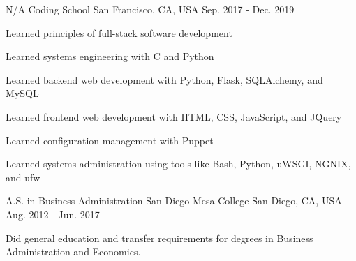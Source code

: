 

\begin{cventries}

  \cventry
    {N/A} %
    {Coding School} %
    {San Francisco, CA, USA} %
    {Sep. 2017 - Dec. 2019} %
    {
      \begin{cvitems} %
        \item {Learned principles of full-stack software development}
        \item {Learned systems engineering with C and Python}
        \item {Learned backend web development with Python, Flask, SQLAlchemy, and MySQL}
        \item {Learned frontend web development with HTML, CSS, JavaScript, and JQuery}
        \item {Learned configuration management with Puppet}
        \item {Learned systems administration using tools like Bash, Python, uWSGI, NGNIX, and ufw}
      \end{cvitems}
    }

  \cventry
    {A.S. in Business Administration} %
    {San Diego Mesa College} %
    {San Diego, CA, USA} %
    {Aug. 2012 - Jun. 2017} %
    {
      \begin{cvitems} %
        \item {Did general education and transfer requirements for degrees in Business Administration and Economics.}
      \end{cvitems}
    }

\end{cventries}
